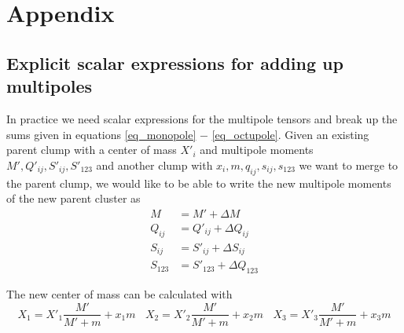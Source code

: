 \section{Appendix}

\subsection{Explicit scalar expressions for adding up multipoles}

In practice we need scalar expressions for the multipole tensors and break up the sums given in equations \ref{eq_monopole} $-$ \ref{eq_octupole}. Given an existing parent clump with a center of mass $X'_{i}$ and multipole moments $M', Q'_{i j}, S'_{i j}, S'_{123}$ and another clump with $x_i, m, q_{i j}, s_{i j}, s_{123}$ we want to merge to the parent clump, we would like to be able to write the new multipole moments of the new parent cluster as
\begin{align}
M &= M' + \Delta M \\
Q_{ij} &= Q'_{ij} + \Delta Q_{ij}\\
S_{ij} &= S'_{ij} + \Delta S_{ij}\\
S_{123} &= S'_{123} + \Delta Q_{123}
\end{align}

The new center of mass can be calculated with
\begin{equation}
X_{1} = X'_{1} \frac{M'}{M'+m} + x_1 m ~~~~ X_{2} = X'_{2} \frac{M'}{M'+m} + x_2 m ~~~~ X_{3} = X'_{3} \frac{M'}{M'+m} + x_3 m
\end{equation}

